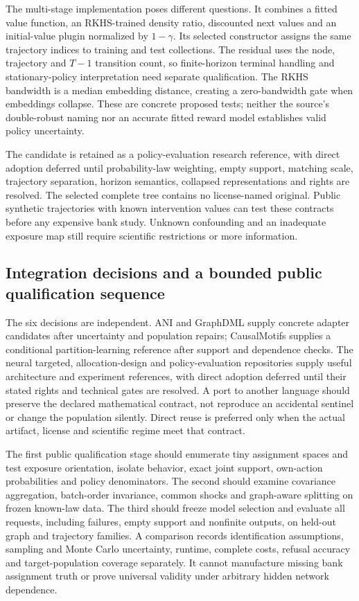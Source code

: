 The multi-stage implementation poses different questions. It combines a fitted value function, an RKHS-trained density ratio, discounted next values and an initial-value plugin normalized by $1-\gamma$. Its selected constructor assigns the same trajectory indices to training and test collections. The residual uses the node, trajectory and $T-1$ transition count, so finite-horizon terminal handling and stationary-policy interpretation need separate qualification. The RKHS bandwidth is a median embedding distance, creating a zero-bandwidth gate when embeddings collapse. These are concrete proposed tests; neither the source's double-robust naming nor an accurate fitted reward model establishes valid policy uncertainty.\citep{exec25_pnet_pie}

The candidate is retained as a policy-evaluation research reference, with direct adoption deferred until probability-law weighting, empty support, matching scale, trajectory separation, horizon semantics, collapsed representations and rights are resolved. The selected complete tree contains no license-named original. Public synthetic trajectories with known intervention values can test these contracts before any expensive bank study. Unknown confounding and an inadequate exposure map still require scientific restrictions or more information.\citep{exec25_pnet_choice}

\subsection{Integration decisions and a bounded public qualification sequence}

The six decisions are independent. ANI and GraphDML supply concrete adapter candidates after uncertainty and population repairs; CausalMotifs supplies a conditional partition-learning reference after support and dependence checks. The neural targeted, allocation-design and policy-evaluation repositories supply useful architecture and experiment references, with direct adoption deferred until their stated rights and technical gates are resolved. A port to another language should preserve the declared mathematical contract, not reproduce an accidental sentinel or change the population silently. Direct reuse is preferred only when the actual artifact, license and scientific regime meet that contract.\citep{exec25_pnet_choice}

The first public qualification stage should enumerate tiny assignment spaces and test exposure orientation, isolate behavior, exact joint support, own-action probabilities and policy denominators. The second should examine covariance aggregation, batch-order invariance, common shocks and graph-aware splitting on frozen known-law data. The third should freeze model selection and evaluate all requests, including failures, empty support and nonfinite outputs, on held-out graph and trajectory families. A comparison records identification assumptions, sampling and Monte Carlo uncertainty, runtime, complete costs, refusal accuracy and target-population coverage separately. It cannot manufacture missing bank assignment truth or prove universal validity under arbitrary hidden network dependence.\citep{exec25_pnet_choice}

